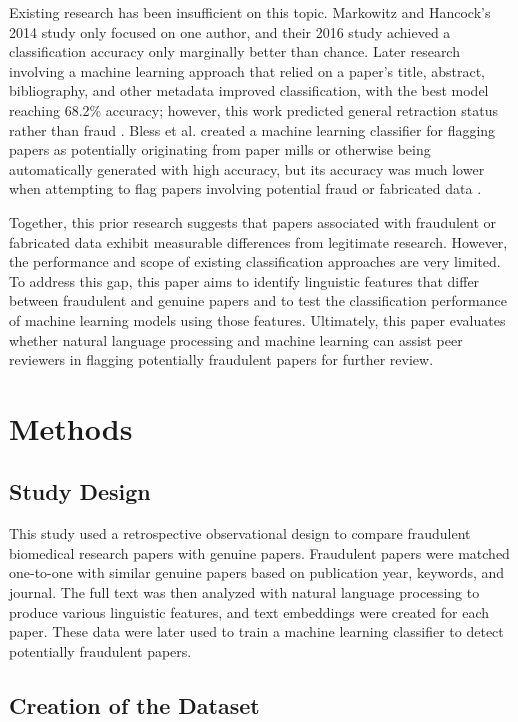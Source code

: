 \documentclass[11pt,letterpaper]{article}
\begin{document}
Existing research has been insufficient on this topic. Markowitz and Hancock's 2014 study only focused on one author, and their 2016 study achieved a classification accuracy only marginally better than chance. Later research involving a machine learning approach that relied on a paper's title, abstract, bibliography, and other metadata improved classification, with the best model reaching 68.2\% accuracy; however, this work predicted general retraction status rather than fraud \cite{retraction_prediction_2025}. Bless et al. created a machine learning classifier for flagging papers as potentially originating from paper mills or otherwise being automatically generated with high accuracy, but its accuracy was much lower when attempting to flag papers involving potential fraud or fabricated data \cite{bless2025}.

Together, this prior research suggests that papers associated with fraudulent or fabricated data exhibit measurable differences from legitimate research. However, the performance and scope of existing classification approaches are very limited. To address this gap, this paper aims to identify linguistic features that differ between fraudulent and genuine papers and to test the classification performance of machine learning models using those features. Ultimately, this paper evaluates whether natural language processing and machine learning can assist peer reviewers in flagging potentially fraudulent papers for further review.

\section{Methods}

\subsection{Study Design}

This study used a retrospective observational design to compare fraudulent biomedical research papers with genuine papers. Fraudulent papers were matched one-to-one with similar genuine papers based on publication year, keywords, and journal. The full text was then analyzed with natural language processing to produce various linguistic features, and text embeddings were created for each paper. These data were later used to train a machine learning classifier to detect potentially fraudulent papers.

\subsection{Creation of the Dataset}
\end{document}
